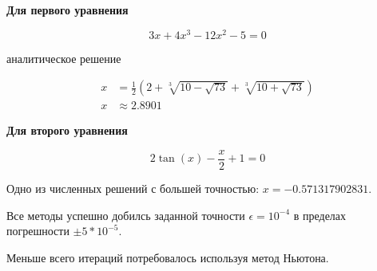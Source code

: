 \documentclass[../main.tex]{subfiles}
\begin{document}
\textbf{Для первого уравнения}

$$ 3x + 4x^3 - 12 x^2 - 5 = 0 $$

аналитическое решение

\begin{align*}
x &= \frac{1}{2}(2 + \sqrt[3]{10 - \sqrt{73}} + \sqrt[3]{10 + \sqrt{73}}) \\
x &\approx 2.8901
\end{align*}

\textbf{Для второго уравнения}

$$ 2 \tan (x) - \frac{x}{2} + 1 = 0 $$

Одно из численных решений с большей точностью: $x = -0.571317902831$.

Все методы успешно добилсь заданной точности $\epsilon = 10^{-4}$ в пределах погрешности $\pm5*10^{-5}$.

Меньше всего итераций потребовалось используя метод Ньютона.
\end{document}
